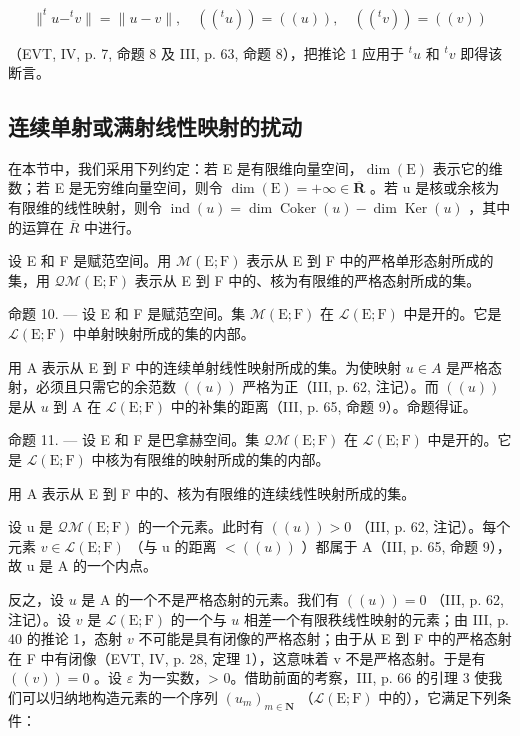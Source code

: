 \[
\| ^ {t} u - ^ {t} v \| = \| u - v \|, \quad ((^ {t} u)) = ((u)), \quad ((^ {t} v)) = ((v))
\]

（EVT, IV, p. 7, 命题 8 及 III, p. 63, 命题 8），把推论 1 应用于 \(^{t}u\) 和 \(^{t}v\) 即得该断言。

\subsection{连续单射或满射线性映射的扰动}

在本节中，我们采用下列约定：若 E 是有限维向量空间，\(\dim(\mathrm{E})\) 表示它的维数；若 E 是无穷维向量空间，则令 \(\dim(\mathrm{E}) = +\infty \in \overline{\mathbf{R}}\) 。若 u 是核或余核为有限维的线性映射，则令 \(\operatorname{ind}(u) = \dim \operatorname{Coker}(u) - \dim \operatorname{Ker}(u)\) ，其中的运算在 \(\overline{R}\) 中进行。

设 E 和 F 是赋范空间。用 \(\mathcal{M}(\mathrm{E};\mathrm{F})\) 表示从 E 到 F 中的严格单形态射所成的集，用 \(\mathcal{Q}\mathcal{M}(\mathrm{E};\mathrm{F})\) 表示从 E 到 F 中的、核为有限维的严格态射所成的集。

命题 10. --- 设 E 和 F 是赋范空间。集 \(\mathcal{M}(\mathrm{E};\mathrm{F})\) 在 \(\mathcal{L}(\mathrm{E};\mathrm{F})\) 中是开的。它是 \(\mathcal{L}(\mathrm{E};\mathrm{F})\) 中单射映射所成的集的内部。

用 A 表示从 E 到 F 中的连续单射线性映射所成的集。为使映射 \(u \in A\) 是严格态射，必须且只需它的余范数 \(((u))\) 严格为正（III, p. 62, 注记）。而 \(((u))\) 是从 \(u\) 到 A 在 \(\mathcal{L}(\mathrm{E};\mathrm{F})\) 中的补集的距离（III, p. 65, 命题 9）。命题得证。

命题 11. --- 设 E 和 F 是巴拿赫空间。集 \(\mathcal{Q}\mathcal{M}(\mathrm{E};\mathrm{F})\) 在 \(\mathcal{L}(\mathrm{E};\mathrm{F})\) 中是开的。它是 \(\mathcal{L}(\mathrm{E};\mathrm{F})\) 中核为有限维的映射所成的集的内部。

用 A 表示从 E 到 F 中的、核为有限维的连续线性映射所成的集。

设 u 是 \(\mathcal{Q}\mathcal{M}(\mathrm{E};\mathrm{F})\) 的一个元素。此时有 \(((u)) > 0\) （III, p. 62, 注记）。每个元素 \(v \in \mathcal{L}(\mathrm{E};\mathrm{F})\) （与 u 的距离 \(<((u))\) ）都属于 A（III, p. 65, 命题 9），故 u 是 A 的一个内点。

反之，设 \(u\) 是 A 的一个不是严格态射的元素。我们有 \(((u)) = 0\) （III, p. 62, 注记）。设 \(v\) 是 \(\mathcal{L}(\mathrm{E};\mathrm{F})\) 的一个与 \(u\) 相差一个有限秩线性映射的元素；由 III, p. 40 的推论 1，态射 \(v\) 不可能是具有闭像的严格态射；由于从 E 到 F 中的严格态射在 F 中有闭像（EVT, IV, p. 28, 定理 1），这意味着 v 不是严格态射。于是有 \(((v)) = 0\) 。设 \(\varepsilon\) 为一实数，\textgreater{} 0。借助前面的考察，III, p. 66 的引理 3 使我们可以归纳地构造元素的一个序列 \((u_{m})_{m \in \mathbf{N}}\) （\(\mathcal{L}(\mathrm{E}; \mathrm{F})\) 中的），它满足下列条件：

